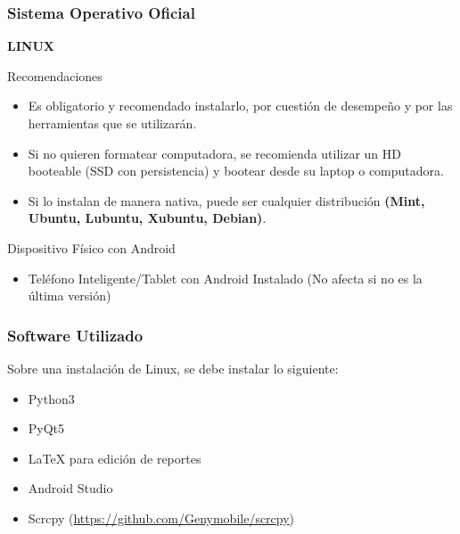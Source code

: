 \begin{frame}
\frametitle{Sistema Operativo Oficial}

\textbf{LINUX}
\begin{block}{Recomendaciones}
\begin{itemize}
\item Es obligatorio y recomendado instalarlo, por cuestión de desempeño y por las herramientas que se utilizarán.
\item Si no quieren formatear computadora, se recomienda utilizar un HD booteable (SSD con persistencia) y bootear desde su laptop o computadora.
\item Si lo instalan de manera nativa, puede ser cualquier distribución \textbf{(Mint, Ubuntu, Lubuntu, Xubuntu, Debian)}.
\end{itemize}
\end{block}
\begin{block}{Dispositivo Físico con Android}
\begin{itemize}
\item Teléfono Inteligente/Tablet con Android Instalado (No afecta si no es la última versión)
\end{itemize}
\end{block}
\end{frame}


\begin{frame}
\frametitle{Software Utilizado}
Sobre una instalación de Linux, se debe instalar lo siguiente:
\begin{itemize}
\item Python3
\item PyQt5
\item LaTeX para edición de reportes
\item Android Studio
\item Scrcpy (\url{https://github.com/Genymobile/scrcpy})
\end{itemize}
\end{frame}

